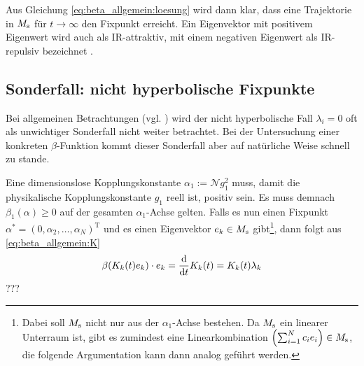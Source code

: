     Aus Gleichung \eqref{eq:beta_allgemein:loesung} wird dann klar, dass eine Trajektorie in 
    $M_\text{s}$ für $t\to\infty$ den Fixpunkt erreicht. Ein Eigenvektor mit positivem 
    Eigenwert wird auch als IR-attraktiv, mit einem negativen Eigenwert als IR-repulsiv 
    bezeichnet \cite{Weinberg:1976}. 
  \subsection{Sonderfall: nicht hyperbolische Fixpunkte}
    Bei allgemeinen Betrachtungen (vgl. \cite{Weinberg:1976}) 
    wird der nicht hyperbolische Fall $\lambda_i = 0$ oft als unwichtiger Sonderfall nicht 
    weiter betrachtet. Bei der Untersuchung einer konkreten $\beta$-Funktion kommt dieser 
    Sonderfall aber auf natürliche Weise schnell zu stande.
    
    Eine dimensionslose Kopplungskonstante $\alpha_1:=\mathcal{N}g_1^2$ muss, damit die 
    physikalische Kopplungskonstante $g_1$ reell ist, positiv sein. Es muss demnach 
    $\beta_1(\alpha)\geq 0$ auf der gesamten $\alpha_1$-Achse gelten. Falls es nun einen 
    Fixpunkt $\alpha^*=(0,\alpha_2,\ldots,\alpha_N)^\text{T}$ und es einen Eigenvektor
    $e_k\in M_\text{s}$ gibt\footnote{Dabei 
    soll $M_\text{s}$ nicht nur aus der $\alpha_1$-Achse bestehen. Da $M_\text{s}$ ein linearer Unterraum 
    ist, gibt es zumindest eine Linearkombination $\left(\sum_{i=1}^N c_ie_i\right)\in M_\text{s}$, 
    die folgende Argumentation kann dann analog geführt werden.},
    dann folgt aus \eqref{eq:beta_allgemein:K}
    \begin{equation}
     \beta(K_k(t)e_k)\cdot e_k = \frac{\text{d}}{\text{d} t} K_k(t) = K_k(t) \lambda_k
    \end{equation}
    ???
    

